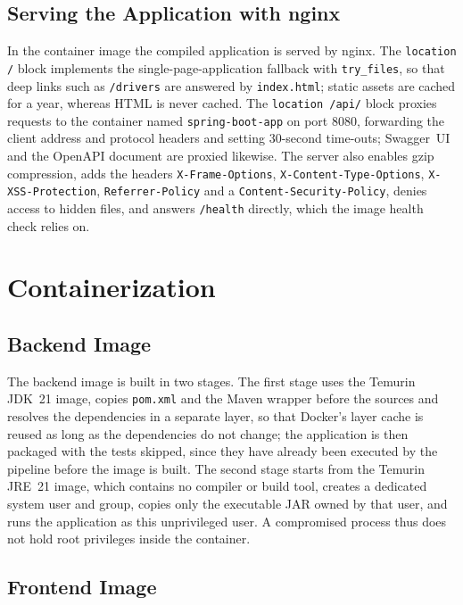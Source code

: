 \subsection{Serving the Application with nginx}

In the container image the compiled application is served by nginx. The \texttt{location /} block implements the single-page-application fallback with \texttt{try\_files}, so that deep links such as \texttt{/drivers} are answered by \texttt{index.html}; static assets are cached for a year, whereas HTML is never cached. The \texttt{location /api/} block proxies requests to the container named \texttt{spring-boot-app} on port 8080, forwarding the client address and protocol headers and setting 30-second time-outs; Swagger~UI and the OpenAPI document are proxied likewise. The server also enables gzip compression, adds the headers \texttt{X-Frame-Options}, \texttt{X-Content-Type-Options}, \texttt{X-XSS-Protection}, \texttt{Referrer-Policy} and a \texttt{Content-Security-Policy}, denies access to hidden files, and answers \texttt{/health} directly, which the image health check relies on.


\section{Containerization}
\label{sec:impl-docker}

\subsection{Backend Image}

The backend image is built in two stages. The first stage uses the Temurin JDK~21 image, copies \texttt{pom.xml} and the Maven wrapper before the sources and resolves the dependencies in a separate layer, so that Docker's layer cache is reused as long as the dependencies do not change; the application is then packaged with the tests skipped, since they have already been executed by the pipeline before the image is built. The second stage starts from the Temurin JRE~21 image, which contains no compiler or build tool, creates a dedicated system user and group, copies only the executable JAR owned by that user, and runs the application as this unprivileged user. A compromised process thus does not hold root privileges inside the container.


\subsection{Frontend Image}

